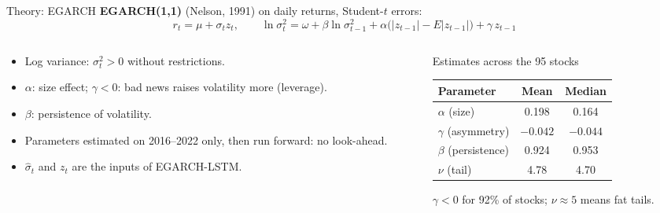 \documentclass[aspectratio=169, 10pt]{beamer}
\begin{document}
\begin{frame}{Theory: EGARCH}
    \textbf{EGARCH(1,1)} (Nelson, 1991) on daily returns, Student-$t$ errors:
    $$r_t = \mu + \sigma_t z_t, \qquad
    \ln\sigma_t^2 = \omega + \beta\ln\sigma_{t-1}^2 + \alpha\big(|z_{t-1}| - E|z_{t-1}|\big) + \gamma\,z_{t-1}$$
    \begin{columns}[T]
        \begin{column}{0.5\textwidth}
            \small
            \begin{itemize}
                \item Log variance: $\sigma_t^2 > 0$ without restrictions.
                \item $\alpha$: size effect; $\gamma<0$: bad news raises volatility more (leverage).
                \item $\beta$: persistence of volatility.
                \item Parameters estimated on 2016--2022 only, then run forward: no look-ahead.
                \item $\hat\sigma_t$ and $z_t$ are the inputs of EGARCH-LSTM.
            \end{itemize}
        \end{column}
        \begin{column}{0.46\textwidth}
            \centering
            \small Estimates across the 95 stocks
            \vspace{0.1cm}

            \begin{adjustbox}{max width=\linewidth}\begin{tabular}{lcc}
                \toprule
                Parameter & Mean & Median \\
                \midrule
                $\alpha$ (size)        & 0.198 & 0.164 \\
                $\gamma$ (asymmetry)   & $-0.042$ & $-0.044$ \\
                $\beta$ (persistence)  & 0.924 & 0.953 \\
                $\nu$ (tail)           & 4.78 & 4.70 \\
                \bottomrule
            \end{tabular}\end{adjustbox}

            \vspace{0.15cm}
            \raggedright\footnotesize $\gamma<0$ for 92\% of stocks; $\nu\approx 5$ means fat tails.
        \end{column}
    \end{columns}
\end{frame}
\end{document}
